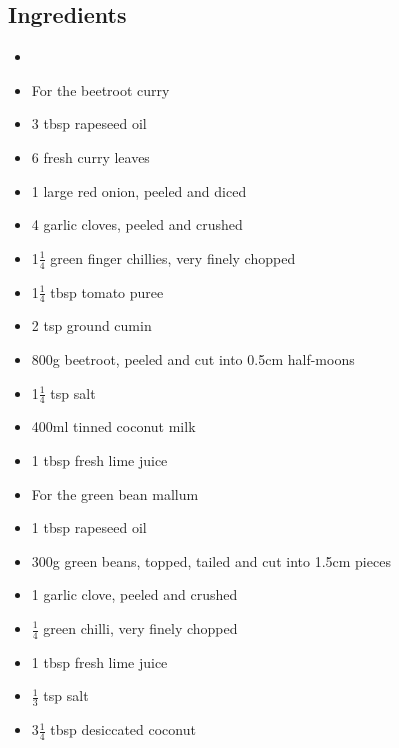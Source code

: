 \documentclass{book}
\begin{document}
\subsection*{Ingredients}
\begin{itemize}
\item  
\end{itemize}

\begin{itemize}
\item For the beetroot curry 
\item 3 tbsp rapeseed oil 
\item 6 fresh curry leaves 
\item 1 large red onion, peeled and diced 
\item 4 garlic cloves, peeled and crushed
\item 1$\frac{1}{4}$ green finger chillies, very finely chopped 
\item 1$\frac{1}{4}$ tbsp tomato puree 
\item 2 tsp ground cumin 
\item 800g beetroot, peeled and cut into 0.5cm half-moons 
\item 1$\frac{1}{4}$ tsp salt 
\item 400ml tinned coconut milk 
\item 1 tbsp fresh lime juice 
\end{itemize}

\begin{itemize}
\item For the green bean mallum 
\item 1 tbsp rapeseed oil 
\item 300g green beans, topped, tailed and cut into 1.5cm pieces
\item 1 garlic clove, peeled and crushed 
\item $\frac{1}{4}$ green chilli, very finely chopped 
\item 1 tbsp fresh lime juice 
\item $\frac{1}{3}$ tsp salt 
\item 3$\frac{1}{4}$ tbsp desiccated coconut 
\end{itemize}
\end{document}
